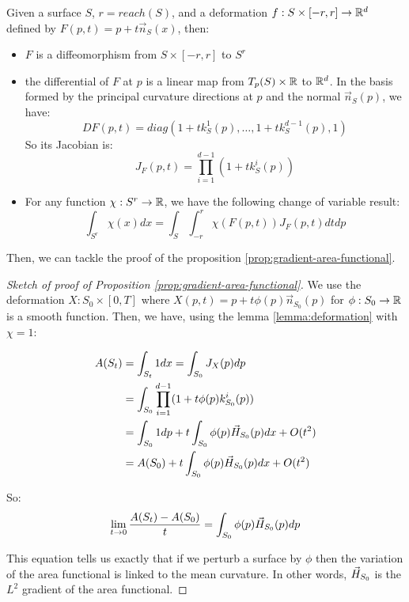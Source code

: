 \begin{lemma}
    \label{lemma:diffeo}

    Given a surface $ S $, $ r = reach(S) $, and a deformation $ f : S \times
    [-r, r] \to \mathbb{R}^d $ defined by $ F(p, t) = p + t \vec{n}_S(x) $, then:

    \begin{itemize}
        \item $ F $ is a diffeomorphism from $ S \times [-r, r] $ to $ S^r $
        \item the differential of $ F $ at $ p $ is a linear map from $ T_p(S)
            \times \mathbb{R} $ to $ \mathbb{R}^d $. In the basis formed by the principal
            curvature directions at $ p $ and the normal $ \vec{n}_S(p) $, we have:
            \begin{equation}
                D F(p, t) = diag(1 + t k^1_S(p), \ldots, 1 + t k^{d-1}_S(p), 1)
            \end{equation}
            So its Jacobian is:
            \begin{equation}
                J_F(p, t) = \prod_{i=1}^{d-1} (1 + t k^i_S(p))
            \end{equation}
        \item For any function $ \chi : S^r \to \mathbb{R} $, we have the following
            change of variable result:
            \begin{equation}
                \int_{S^r} \chi(x) dx = \int_S \int_{-r}^r \chi(F(p, t)) J_F(p,
                t) dt dp
            \end{equation}
    \end{itemize}
\end{lemma}

Then, we can tackle the proof of the proposition
\ref{prop:gradient-area-functional}.

\begin{proof}[Sketch of proof of Proposition \ref{prop:gradient-area-functional}]
    We use the deformation $ X : S_0 \times [0, T] $ where $ X(p, t) = p + t
    \phi(p) \vec{n}_{S_0}(p) $ for $ \phi : S_0 \to \mathbb{R} $ is a smooth
    function. Then, we have, using the lemma \ref{lemma:deformation} with $ \chi
    = 1 $:

    \begin{align*}
        A(S_t) &= \int_{S_t} 1 dx = \int_{S_0} J_X(p) dp \\
        &= \int_{S_0} \prod_{i=1}^{d-1} (1 + t \phi(p) k^i_{S_0}(p)) \\
        &= \int_{S_0} 1 dp + t \int_{S_0} \phi(p) \vec{H}_{S_0}(p) dx + O(t^2) \\
        &= A(S_0) + t \int_{S_0} \phi(p) \vec{H}_{S_0}(p) dx + O(t^2)
    \end{align*}

    So:
    $$ \lim\limits_{t \to 0} \frac{A(S_t) - A(S_0)}{t}= \int_{S_0}
    \phi(p) \vec{H}_{S_0}(p) dp $$

    This equation tells us exactly that if we perturb a surface by $ \phi $
    then the variation of the area functional is linked to the mean curvature.
    In other words, $ \vec{H}_{S_0} $ is the $ L^2 $ gradient of the area
    functional.
\end{proof}

